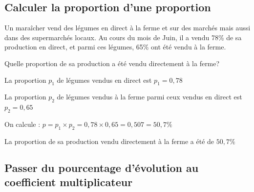 \documentclass[11pt,a4paper]{book}
\begin{document}
\subsection{Calculer la proportion d'une proportion}

\begin{bmethode}
    
    Un maraîcher vend des légumes en direct à la ferme et sur des marchés mais aussi dans des supermarchés locaux. Au cours du mois de Juin, il a vendu 78\% de sa production en direct, et parmi ces légumes, 65\% ont été vendu à la ferme.
    
    Quelle proportion de sa production a été vendu directement à la ferme?
    
    \hfill 
    
    
    
    La proportion $p_1$ de légumes vendus en direct est $p_1=0,78$
    
    La proportion $p_2$ de légumes vendus à la ferme parmi ceux vendus en direct est $p_2=0,65$
    
    On calcule : $p=p_1\times p_2=0,78\times0,65=0,507=50,7\%$
    
    La proportion de sa production vendu directement à la ferme a été de $50,7\%$
  
\end{bmethode}

\subsection{Passer du pourcentage d'évolution au coefficient multiplicateur}
\end{document}
